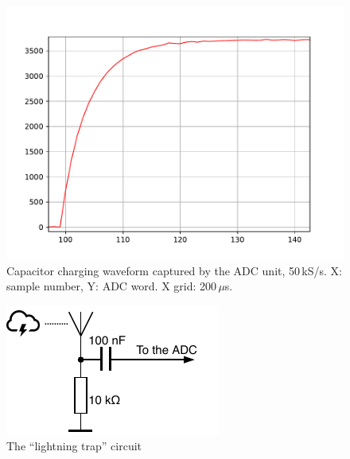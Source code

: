 \begin{figure}[h]
\centering
\includegraphics[width=\textwidth]{img/transient.pdf}
\caption{Capacitor charging waveform captured by the ADC unit, 50\,kS/s. X: sample number, Y: ADC word. X grid: 200\,$\mu$s.}
\label{fig:captransient}
\end{figure}

\begin{figure}[b]
\centering
\includegraphics[scale=1.2]{img/thundertrap.pdf}
\caption{The ``lightning trap'' circuit}
\label{fig:lightningtrap}
\end{figure}

